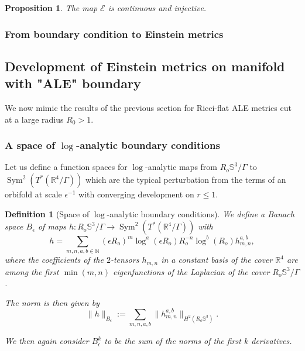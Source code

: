 \documentclass[12pt]{article}
\newtheorem{prop}[thm]{Proposition}
\newtheorem{defn}[thm]{Definition}
\begin{document}
    \begin{prop}
        The map $\mathcal{E}$ is continuous and injective.
    \end{prop}
    
    \subsubsection{From boundary condition to Einstein metrics}
    
    
    
    
    \subsection{Development of Einstein metrics on manifold with "ALE" boundary}
    
    We now mimic the results of the previous section for Ricci-flat ALE metrics cut at a large radius $R_0>1$.
    
    
    \subsubsection{A space of $\log$-analytic boundary conditions}
    
    Let us define a function spaces for $\log$-analytic maps from $ R_o\mathbb{S}^3\slash\Gamma $ to $\operatorname{Sym}^2(T^*(\mathbb{R}^4\slash\Gamma))$ which are the typical perturbation from the terms of an orbifold at scale $\epsilon^{-1}$ with converging development on $r \leqslant 1$.
    \begin{defn}[Space of $\log$-analytic boundary conditions]
        We define a Banach space $B_\epsilon$ of maps $h: R_o\mathbb{S}^3\slash\Gamma \to \operatorname{Sym}^2(T^*(\mathbb{R}^4\slash\Gamma))$ with 
        $$h= \sum_{m,n,a,b\in \mathbb{N}} (\epsilon R_o)^m\log^a(\epsilon R_o) R_o^{-n}\log^b(R_o) h_{m,n}^{a,b}, $$ 
        where the coefficients of the $2$-tensors $h_{m,n}$ in a constant basis of the cover $\mathbb{R}^4$ are among the first $\min(m,n)$ eigenfunctions of the Laplacian of the cover $R_o\mathbb{S}^3\slash\Gamma$.
        
        The norm is then given by $$\|h\|_{B_\epsilon}:=\sum_{m,n,a,b} \|h_{m,n}^{a,b}\|_{H^2(R_o\mathbb{S}^3)}.$$
        
        We then again consider $B_\epsilon^k$ to be the sum of the norms of the first $k$ derivatives.
    \end{defn}
    
\end{document}
